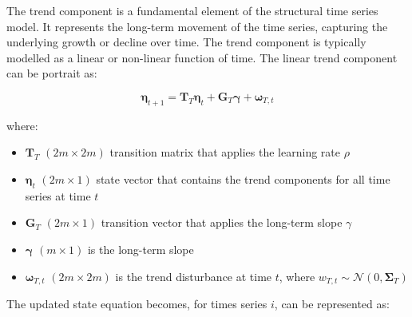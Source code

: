     The trend component is a fundamental element of the structural time series model.
    It represents the long-term movement of the time series, capturing the underlying growth or decline over time.
    The trend component is typically modelled as a linear or non-linear function of time.
    The linear trend component can be portrait as:


    \begin{equation}
        \bm{\eta}_{t+1}=
            \bm{T}_{T} \bm{\eta}_{t} + \bm{G}_{T} \bm{\gamma} + \bm{\omega}_{T,t}
        \label{eq:trend_state}
    \end{equation}

    where:
    \begin{itemize}
        \item $\bm{T}_T$ $(2m \times 2m)$ transition matrix that applies the learning rate $\rho$
        \item $\bm{\eta}_{t}$ $(2m \times 1)$ state vector that contains the trend components for all time series at time $t$
        \item $\bm{G}_T$ $(2m \times 1)$ transition vector that applies the long-term slope $\gamma$
        \item $\bm{\gamma}$ $(m \times 1)$ is the long-term slope
        \item $\bm{\omega}_{T,t}$ $(2m \times 2m)$ is the trend disturbance at time $t$,
            where $w_{T,t} \sim \mathcal{N}(0, \bm{\Sigma}_{T})$
    \end{itemize}

    The updated state equation becomes, for times series $i$, can be represented as:

